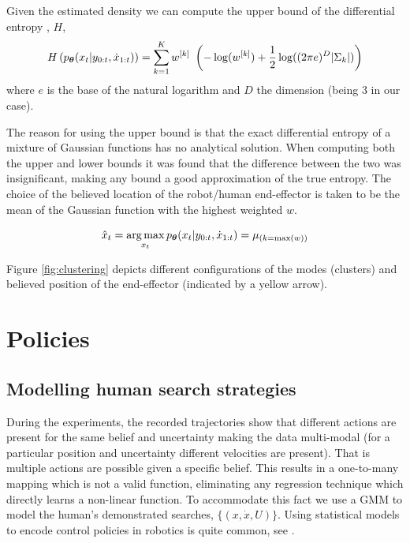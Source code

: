 Given the estimated density we can compute the upper bound of the differential entropy \cite{DiffEntropyHuber2008}, $H$,
\begin{equation}
  H\left(  p_{\boldsymbol{\theta}}(x_t|y_{0:t},\dot{x}_{1:t}) \right) = \sum\limits_{k=1}^{K} w^{[k]}\ \left( -\log(w^{[k]}) + \frac{1}{2} \log((2\pi e)^{D} |\Sigma_{k}|) \right)
\end{equation}
where $e$ is the base of the natural logarithm and $D$ the dimension (being 3 in our case).

The reason for using the upper bound is that the exact differential entropy of a mixture of Gaussian functions has no 
analytical solution. When computing both the
upper and lower bounds it was found that the difference between the two was insignificant, making any bound a good approximation 
of the true entropy. The choice of the believed location of the robot/human end-effector is taken to be the mean of the 
Gaussian function with the highest weighted $w$.

\begin{equation}
 \hat{x}_t = \operatorname*{arg\,max}_{x_t} p_{\boldsymbol{\theta}}(x_{t}|y_{0:t},\dot{x}_{1:t}) = \mu_{(k = \max(w))}
\end{equation}

Figure \ref{fig:clustering} depicts different configurations of the modes (clusters) and believed position of the end-effector (indicated by a yellow arrow).  





\section{Policies}\label{chap3:policies}

\subsection{Modelling human search strategies}\label{chap3:GMM_policy}

During the experiments, the recorded trajectories show that different actions are present for the same belief and uncertainty making the data multi-modal
(for a particular position and uncertainty different velocities are present). That is multiple actions are possible given a specific belief. 
This results in a one-to-many mapping which is not a valid function, eliminating any regression technique which directly learns a non-linear function. 
To accommodate this fact we use a GMM to model the human's demonstrated searches, $\{(x,\dot{x},U)\}$. 
Using statistical models to encode control policies in robotics is quite common, see \cite{Billard08chapter}. 

